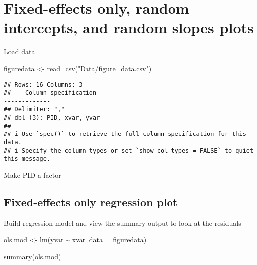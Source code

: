 \documentclass[
]{article}
\newenvironment{Shaded}{\begin{snugshade}}{\end{snugshade}}
\newcommand{\AttributeTok}[1]{\textcolor[rgb]{0.77,0.63,0.00}{#1}}
\newcommand{\FunctionTok}[1]{\textcolor[rgb]{0.00,0.00,0.00}{#1}}
\newcommand{\NormalTok}[1]{#1}
\newcommand{\OtherTok}[1]{\textcolor[rgb]{0.56,0.35,0.01}{#1}}
\newcommand{\SpecialCharTok}[1]{\textcolor[rgb]{0.00,0.00,0.00}{#1}}
\newcommand{\StringTok}[1]{\textcolor[rgb]{0.31,0.60,0.02}{#1}}
\begin{document}
\hypertarget{fixed-effects-only-random-intercepts-and-random-slopes-plots}{%
\section{Fixed-effects only, random intercepts, and random slopes
plots}\label{fixed-effects-only-random-intercepts-and-random-slopes-plots}}

Load data

\begin{Shaded}
\begin{Highlighting}[]
\NormalTok{figuredata }\OtherTok{\textless{}{-}} \FunctionTok{read\_csv}\NormalTok{(}\StringTok{"Data/figure\_data.csv"}\NormalTok{)}
\end{Highlighting}
\end{Shaded}

\begin{verbatim}
## Rows: 16 Columns: 3
## -- Column specification --------------------------------------------------------
## Delimiter: ","
## dbl (3): PID, xvar, yvar
## 
## i Use `spec()` to retrieve the full column specification for this data.
## i Specify the column types or set `show_col_types = FALSE` to quiet this message.
\end{verbatim}

Make PID a factor

\begin{Shaded}
\end{Shaded}

\hypertarget{fixed-effects-only-regression-plot}{%
\subsection{Fixed-effects only regression
plot}\label{fixed-effects-only-regression-plot}}

Build regression model and view the summary output to look at the
residuals

\begin{Shaded}
\begin{Highlighting}[]
\NormalTok{ols.mod }\OtherTok{\textless{}{-}} \FunctionTok{lm}\NormalTok{(yvar }\SpecialCharTok{\textasciitilde{}}\NormalTok{ xvar, }\AttributeTok{data =}\NormalTok{ figuredata)}

\FunctionTok{summary}\NormalTok{(ols.mod)}
\end{Highlighting}
\end{Shaded}
\end{document}
